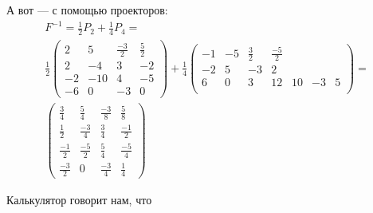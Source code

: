 \documentclass[12pt, a4paper]{article}
\begin{document}
    А вот — с помощью проекторов:
    \begin{multline}
        F^{-1} = \frac12 P_{2} + \frac14 P_4 = \\
        \frac12 \left(\begin{matrix}
            2 & 5 & \frac{-3}{2} & \frac{5}{2} \\
            2 & -4 & 3 & -2 \\
            -2 & -10 & 4 & -5 \\
            -6 & 0 & -3 & 0
        \end{matrix}\right) + \frac14 \left(\begin{matrix}
            -1 & -5 & \frac{3}{2} & \frac{-5}{2} \\
            -2 & 5 & -3 & 2 \\
            6 & 0 & 3 & 1
            2 & 10 & -3 & 5 \\
        \end{matrix}\right) = \\ 
        \left(\begin{matrix}
            \frac{3}{4} & \frac{5}{4} & \frac{-3}{8} & \frac{5}{8} \\
            \frac{1}{2} & \frac{-3}{4} & \frac{3}{4} & \frac{-1}{2} \\
            \frac{-1}{2} & \frac{-5}{2} & \frac{5}{4} & \frac{-5}{4} \\
            \frac{-3}{2} & 0 & \frac{-3}{4} & \frac{1}{4}
        \end{matrix}\right)
    \end{multline}
 
    Калькулятор говорит нам, что
\end{document}
